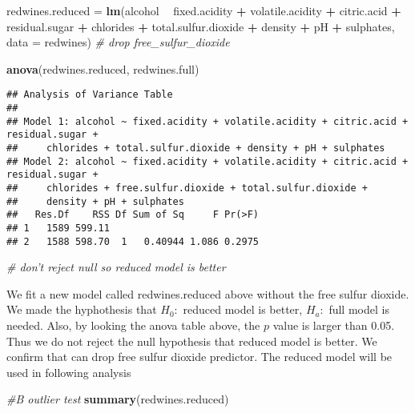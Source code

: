 \documentclass[
]{article}
\newenvironment{Shaded}{\begin{snugshade}}{\end{snugshade}}
\newcommand{\CommentTok}[1]{\textcolor[rgb]{0.56,0.35,0.01}{\textit{#1}}}
\newcommand{\DataTypeTok}[1]{\textcolor[rgb]{0.13,0.29,0.53}{#1}}
\newcommand{\KeywordTok}[1]{\textcolor[rgb]{0.13,0.29,0.53}{\textbf{#1}}}
\newcommand{\NormalTok}[1]{#1}
\newcommand{\OperatorTok}[1]{\textcolor[rgb]{0.81,0.36,0.00}{\textbf{#1}}}
\newcommand{\StringTok}[1]{\textcolor[rgb]{0.31,0.60,0.02}{#1}}
\begin{document}
\begin{Shaded}
\begin{Highlighting}[]
\NormalTok{redwines.reduced =}\StringTok{ }\KeywordTok{lm}\NormalTok{(alcohol }\OperatorTok{~}\StringTok{ }\NormalTok{fixed.acidity }\OperatorTok{+}
\StringTok{    }\NormalTok{volatile.acidity }\OperatorTok{+}\StringTok{ }\NormalTok{citric.acid }\OperatorTok{+}\StringTok{ }\NormalTok{residual.sugar }\OperatorTok{+}\StringTok{ }
\StringTok{    }\NormalTok{chlorides }\OperatorTok{+}\StringTok{ }\NormalTok{total.sulfur.dioxide }\OperatorTok{+}\StringTok{ }
\StringTok{    }\NormalTok{density }\OperatorTok{+}\StringTok{ }\NormalTok{pH }\OperatorTok{+}\StringTok{ }\NormalTok{sulphates, }\DataTypeTok{data =}\NormalTok{ redwines) }\CommentTok{# drop free_sulfur_dioxide}

\KeywordTok{anova}\NormalTok{(redwines.reduced, redwines.full)}
\end{Highlighting}
\end{Shaded}

\begin{verbatim}
## Analysis of Variance Table
## 
## Model 1: alcohol ~ fixed.acidity + volatile.acidity + citric.acid + residual.sugar + 
##     chlorides + total.sulfur.dioxide + density + pH + sulphates
## Model 2: alcohol ~ fixed.acidity + volatile.acidity + citric.acid + residual.sugar + 
##     chlorides + free.sulfur.dioxide + total.sulfur.dioxide + 
##     density + pH + sulphates
##   Res.Df    RSS Df Sum of Sq     F Pr(>F)
## 1   1589 599.11                          
## 2   1588 598.70  1   0.40944 1.086 0.2975
\end{verbatim}

\begin{Shaded}
\begin{Highlighting}[]
\CommentTok{# don't reject null so reduced model is better}
\end{Highlighting}
\end{Shaded}

We fit a new model called redwines.reduced above without the free sulfur
dioxide. We made the hyphothesis that \(H_0 :\) reduced model is better,
\(H_a:\) full model is needed. Also, by looking the anova table above,
the \(p\) value is larger than 0.05. Thus we do not reject the null
hypothesis that reduced model is better. We confirm that can drop free
sulfur dioxide predictor. The reduced model will be used in following
analysis

\begin{Shaded}
\begin{Highlighting}[]
\CommentTok{#B outlier test}
\KeywordTok{summary}\NormalTok{(redwines.reduced)}
\end{Highlighting}
\end{Shaded}
\end{document}

